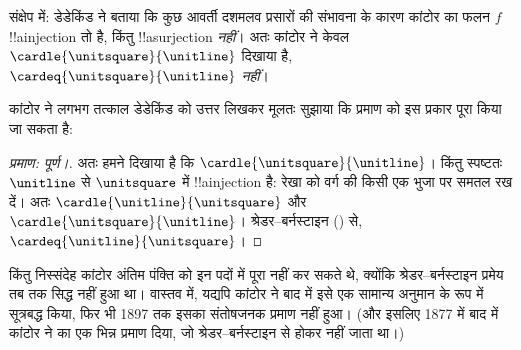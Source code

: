 \documentclass[../../../include/open-logic-section]{subfiles}
\begin{document}
संक्षेप में: डेडेकिंड ने बताया कि कुछ आवर्ती दशमलव प्रसारों की संभावना के
कारण कांटोर का फलन $f$ !!a{injection} तो है, किंतु !!a{surjection}
\emph{नहीं}। अतः कांटोर ने केवल $\cardle{\unitsquare}{\unitline}$ दिखाया
है, $\cardeq{\unitsquare}{\unitline}$ \emph{नहीं}।

कांटोर ने लगभग तत्काल डेडेकिंड को उत्तर लिखकर मूलतः सुझाया कि प्रमाण को इस
प्रकार पूरा किया जा सकता है:

\begin{proof}[प्रमाण: पूर्ण।]
अतः हमने दिखाया है कि $\cardle{\unitsquare}{\unitline}$। किंतु स्पष्टतः
$\unitline$ से $\unitsquare$ में !!a{injection} है: रेखा को वर्ग की किसी
एक भुजा पर समतल रख दें। अतः $\cardle{\unitline}{\unitsquare}$ और
$\cardle{\unitsquare}{\unitline}$। श्रेडर--बर्नस्टाइन
() से,
$\cardeq{\unitline}{\unitsquare}$।
\end{proof}

किंतु निस्संदेह कांटोर अंतिम पंक्ति को इन पदों में पूरा नहीं कर सकते थे,
क्योंकि श्रेडर--बर्नस्टाइन प्रमेय तब तक सिद्ध नहीं हुआ था। वास्तव में, यद्यपि
कांटोर ने बाद में इसे एक सामान्य अनुमान के रूप में सूत्रबद्ध किया, फिर भी
1897 तक इसका संतोषजनक प्रमाण नहीं हुआ। (और इसलिए 1877 में बाद में कांटोर ने
 का एक भिन्न प्रमाण दिया, जो श्रेडर--बर्नस्टाइन से
होकर नहीं जाता था।)
\end{document}
